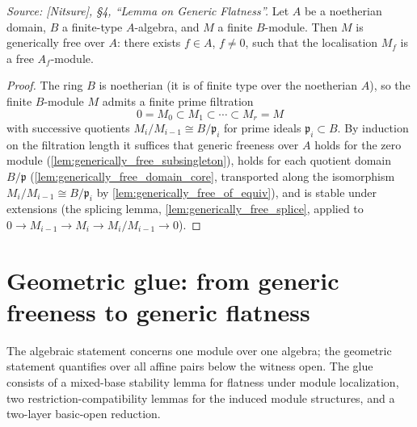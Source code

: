 \begin{theorem}\leanok
  \label{thm:generic_flatness_algebraic}
  \textit{Source: [Nitsure], \S4, ``Lemma on Generic Flatness''.}
  Let \(A\) be a noetherian domain, \(B\) a finite-type \(A\)-algebra, and \(M\) a finite
  \(B\)-module. Then \(M\) is generically free over \(A\): there exists
  \(f \in A\), \(f \ne 0\), such that the localisation
  \(M_f\) is a free \(A_f\)-module.
\end{theorem}

\begin{proof}
\leanok
  The ring \(B\) is noetherian (it is of finite type over the noetherian
  \(A\)), so the finite \(B\)-module \(M\) admits a finite prime filtration
  \[
    0 = M_0 \subset M_1 \subset \cdots \subset M_r = M
  \]
  with successive quotients \(M_i / M_{i-1} \cong B / \mathfrak{p}_i\) for
  prime ideals \(\mathfrak{p}_i \subset B\).  By induction on the filtration
  length it suffices that generic freeness over \(A\) holds for the zero
  module (\cref{lem:generically_free_subsingleton}), holds for each quotient
  domain \(B/\mathfrak{p}\) (\cref{lem:generically_free_domain_core},
  transported along the isomorphism \(M_i/M_{i-1} \cong B/\mathfrak{p}_i\) by
  \cref{lem:generically_free_of_equiv}), and is stable under extensions
  (the splicing lemma, \cref{lem:generically_free_splice}, applied to
  \(0 \to M_{i-1} \to M_i \to M_i/M_{i-1} \to 0\)).
\end{proof}

\section{Geometric glue: from generic freeness to generic flatness}

The algebraic statement concerns one module over one algebra; the geometric
statement quantifies over all affine pairs below the witness open. The glue
consists of a mixed-base stability lemma for flatness under module
localization, two restriction-compatibility lemmas for the induced module
structures, and a two-layer basic-open reduction.

